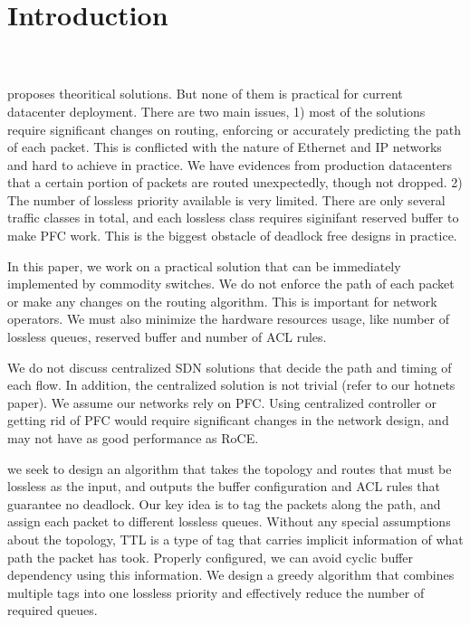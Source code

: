 \section{Introduction}\label{sec:intro}

 \\ 

 \\

 proposes theoritical solutions. But none of them is practical for current datacenter deployment.
There are two main issues, 1) most of the solutions require significant changes on routing, enforcing or accurately predicting
the path of each packet. This is conflicted with the nature of Ethernet and IP networks and hard to achieve in practice.
We have evidences from production datacenters that a certain portion of packets are routed unexpectedly, though not dropped.
2) The number of lossless priority available is very limited. There are only several traffic classes in total,
and each lossless class requires siginifant reserved buffer to make PFC work. This is the biggest obstacle of 
deadlock free designs in practice.

 In this paper, we work on a practical solution that can be immediately implemented by 
commodity switches. We do not enforce the path of each packet or make any changes on the routing algorithm. 
This is important for network operators. We must also minimize the hardware resources usage, like number of lossless
queues, reserved buffer and number of ACL rules. 

 We do not discuss centralized SDN solutions that decide the path and timing of each flow. In 
addition, the centralized solution is not trivial (refer
to our hotnets paper). We assume our networks rely on PFC. Using centralized controller or getting rid of PFC would require 
significant changes in the network design, and may not have as good performance as RoCE.

 we seek to design an algorithm that takes the topology and routes that must be lossless as the 
input, and outputs the buffer configuration and ACL rules that guarantee no deadlock. Our key idea is to tag the packets along 
the path, and assign each packet to different lossless queues. Without any special assumptions about the topology, 
TTL is a type of tag that carries implicit information of what path the packet has took.
Properly configured, we can avoid cyclic buffer dependency using this information.
We design a greedy algorithm that combines multiple tags into one lossless priority and effectively reduce the number of 
required queues.

